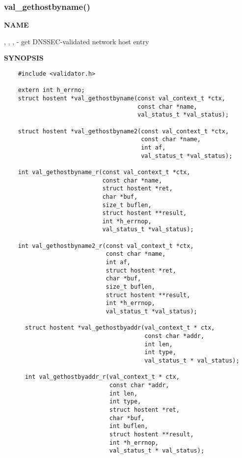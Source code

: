 \clearpage

\subsubsection{val\_gethostbyname()}

{\bf NAME}

, ,
,  -
get DNSSEC-validated network host entry

{\bf SYNOPSIS}

\begin{verbatim}
    #include <validator.h>

    extern int h_errno;
    struct hostent *val_gethostbyname(const val_context_t *ctx,
                                      const char *name,
                                      val_status_t *val_status);

    struct hostent *val_gethostbyname2(const val_context_t *ctx,
                                       const char *name,
                                       int af,
                                       val_status_t *val_status);

    int val_gethostbyname_r(const val_context_t *ctx,
                            const char *name,
                            struct hostent *ret,
                            char *buf,
                            size_t buflen,
                            struct hostent **result,
                            int *h_errnop,
                            val_status_t *val_status);

    int val_gethostbyname2_r(const val_context_t *ctx,
                             const char *name,
                             int af,
                             struct hostent *ret,
                             char *buf,
                             size_t buflen,
                             struct hostent **result,
                             int *h_errnop,
                             val_status_t *val_status);

      struct hostent *val_gethostbyaddr(val_context_t * ctx,
                                        const char *addr,
                                        int len,
                                        int type, 
                                        val_status_t * val_status);

      int val_gethostbyaddr_r(val_context_t * ctx,
                              const char *addr,
                              int len,
                              int type,
                              struct hostent *ret,
                              char *buf,
                              int buflen,
                              struct hostent **result,
                              int *h_errnop,
                              val_status_t * val_status);

\end{verbatim}

